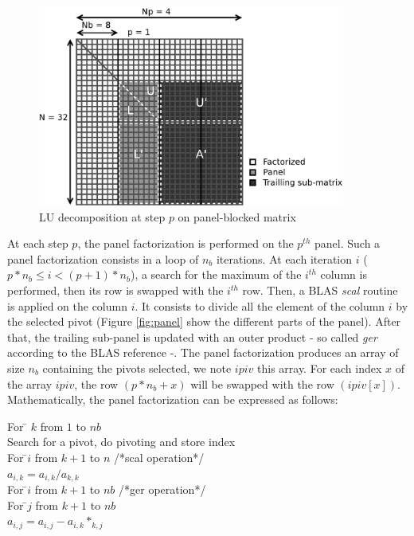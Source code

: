 \begin{figure}[!ht]
\centering
\includegraphics[width=0.9\textwidth]{figures/panel_matrix_bw.pdf}
\caption{LU decomposition at step $p$ on panel-blocked matrix \label{fig:matrix}}
\end{figure}

 
At each step $p$, the panel factorization is performed on the $p^{th}$ panel. Such a panel factorization consists in a loop of $n_b$ iterations. At each iteration $i$ ($p*n_b \leq i < (p+1)*n_b$), a search for the maximum of the $i^{th}$ column is performed, then its row is swapped with the $i^{th}$ row.
Then, a BLAS \textit{scal} routine is applied on the column $i$. It consists to divide all the element of the column $i$ by the selected pivot (Figure \ref{fig:panel} show the different parts of the panel).
After that, the trailing sub-panel is updated with an outer product - so called \textit{ger} according to the BLAS reference -. The panel factorization produces an array of size $n_b$ containing the pivots selected, we note $ipiv$ this array. For each index $x$ of the array $ipiv$, the row $(p*n_b + x)$ will be swapped with the row $(ipiv[x])$.
Mathematically, the panel factorization can be expressed as follows:\\
\begin{tabbing}
For \= $k$ from $1$ to $nb$\\
\> Search for a pivot, do pivoting and store index\\
\> For \=$i$ from $k+1$ to $n$    /*scal operation*/\\
\>\> $a_{i,k} = a_{i,k}/a_{k,k}$\\
\> For \=$i$ from $k+1$ to $nb$   /*ger operation*/\\
\>\> For \=$j$ from $k+1$ to $nb$\\
\>\>\> $a_{i,j} = a_{i,j}-a_{i,k}*_{k,j}$\\
\end{tabbing}

